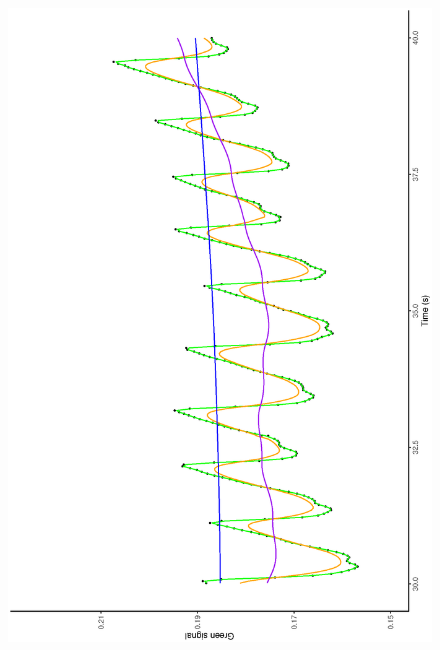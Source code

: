 \documentclass[twocolumn]{bmcart}%
\begin{document}
\begin{figure}[p]
\begin{center}
{{    				\includegraphics[width =\linewidth,angle=270]{pues1d1}
        		        }
		}\\ 	%
		\resizebox{\textwidth}{!}{
        			\subfigure[]{
			    	      \label{fig:pes1d2}
}}
\end{center}
\end{figure}
\end{document}
